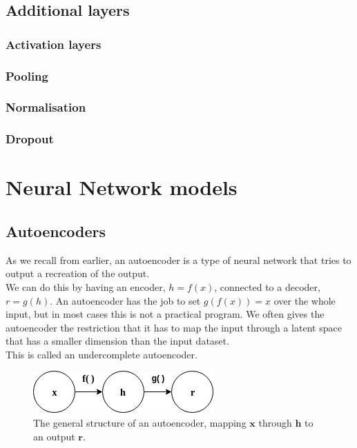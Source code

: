 \subsection{Additional layers}
\subsubsection{Activation layers}
\subsubsection{Pooling}
\subsubsection{Normalisation}
\subsubsection{Dropout}


\section{Neural Network models}

    \subsection{Autoencoders}\label{Explaining_autoencoders}
As we recall from earlier, an autoencoder is a type of neural network that tries to output a recreation of the output. \\ 

We can do this by having an encoder, $h=f(x)$, connected to a decoder, $r=g(h)$. 
An autoencoder has the job to set $g(f(x))=x$ over the whole input, but in most cases this is not a practical program. We often gives the autoencoder the restriction
that it has to map the input through a latent space that has a smaller dimension than the input dataset.\\
This is called an undercomplete autoencoder.\\
\vspace{10px}
\begin{figure}[ht!]
	\centering
	\includegraphics[scale=0.5]{background/figures/SimpleAE.png}
	\caption{The general structure of an autoencoder, mapping $\textbf{x}$ through $\textbf{h}$ to an output $\textbf{r}$.}
\end{figure}

